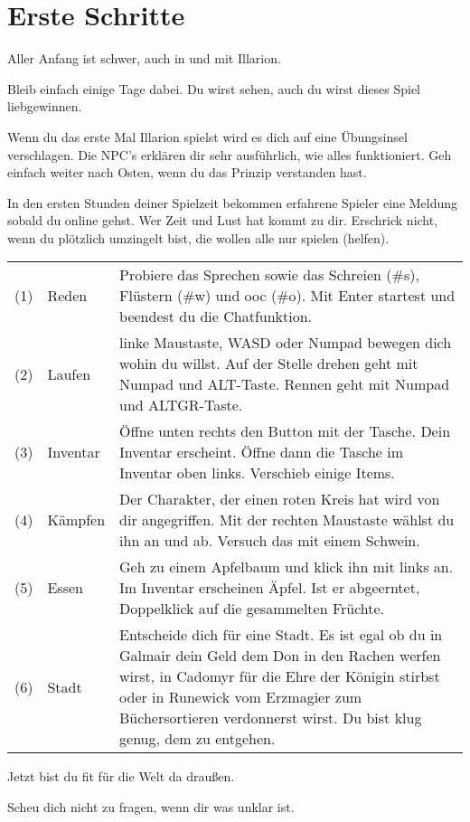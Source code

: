 \documentclass[a4paper,11pt]{book}
\begin{document}
\section{Erste Schritte}

Aller Anfang ist schwer, auch in und mit Illarion.

Bleib einfach einige Tage dabei. Du wirst sehen, auch du wirst dieses Spiel liebgewinnen.

Wenn du das erste Mal Illarion spielst wird es dich auf eine Übungsinsel verschlagen. Die NPC’s erklären dir sehr ausführlich, wie alles funktioniert. Geh einfach weiter nach Osten, wenn du das Prinzip verstanden hast.

In den ersten Stunden deiner Spielzeit bekommen erfahrene Spieler eine Meldung sobald du online gehst. Wer Zeit und Lust hat kommt zu dir. Erschrick nicht, wenn du plötzlich umzingelt bist, die wollen alle nur spielen (helfen).



\begin{tabular}{ l l p{9cm} }
  (1) & Reden & Probiere das Sprechen sowie das Schreien (\#s), Flüstern (\#w) und ooc (\#o). Mit Enter startest und beendest du die Chatfunktion. \\
  (2) & Laufen & linke Maustaste, WASD oder Numpad bewegen dich wohin du willst. Auf der Stelle drehen geht mit Numpad und ALT-Taste. Rennen geht mit Numpad und ALTGR-Taste. \\
  (3) & Inventar & Öffne unten rechts den Button mit der Tasche. Dein Inventar erscheint. Öffne dann die Tasche im Inventar oben links. Verschieb einige Items. \\
  (4) & Kämpfen & Der Charakter, der einen roten Kreis hat wird von dir angegriffen. Mit der rechten Maustaste wählst du ihn an und ab. Versuch das mit einem Schwein. \\
  (5) & Essen & Geh zu einem Apfelbaum und klick ihn mit links an. Im Inventar erscheinen Äpfel. Ist er abgeerntet, Doppelklick auf die gesammelten Früchte.\\
  (6) & Stadt & Entscheide dich für eine Stadt. Es ist egal ob du in Galmair dein Geld dem Don in den Rachen werfen wirst, in Cadomyr für die Ehre der Königin stirbst oder in Runewick vom Erzmagier zum Büchersortieren verdonnerst wirst. Du bist klug genug, dem zu entgehen.
\end{tabular}
   
Jetzt bist du fit für die Welt da draußen.

{\huge Scheu dich nicht zu fragen, wenn dir was unklar ist.}
\end{document}
